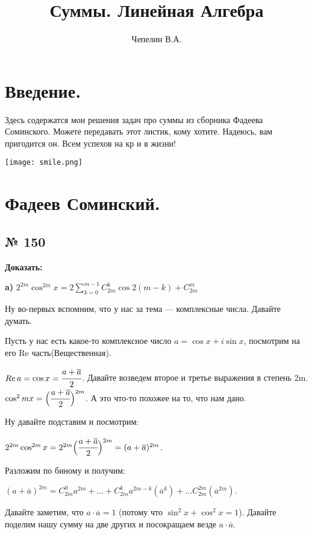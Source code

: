 \documentclass{article}
\title{Суммы. Линейная Алгебра}
\author{Чепелин В.А.}
\date{}
\begin{document}
\maketitle
\tableofcontents
\pagebreak
\section{Введение.}

 Здесь содержатся мои решения задач про суммы 
 из сборника Фадеева Соминского. Можете передавать этот листик, кому хотите. Надеюсь, вам пригодится он. Всем успехов на кр и в жизни!
\begin{center}
   \texttt{[image: smile.png]}
\end{center}

 \pagebreak
 
 \section{Фадеев Соминский.}
 \subsection{№ 150}
 
   \textbf{ Доказать:}
    
    \textbf{a)} $2^{2m}\cos^{2m} x = 2 \sum\limits_{k=0}^{m-1} C_{2m}^k \cos2(m-k) + C_{2m}^m$  

    Ну во-первых вспомним, что у нас за тема --- комплексные числа. Давайте думать.

    Пусть у нас есть какое-то комплексное число $a = \cos x + i\sin x$, посмотрим на его Re часть(Вещественная).
    
    $Re\, a = \cos x = \cfrac{a+\overline{a}}{2}$. Давайте возведем второе и третье выражения в степень 2m. $\cos^2m x = \Big(\cfrac{a+\overline{a}}{2}\Big)^{2m}$. А это что-то похожее на то, что нам дано. 
    
    Ну давайте подставим и посмотрим:

    $2^{2m}\cos^{2m} x = 2^{2m} \Big(\cfrac{a+\overline{a}}{2}\Big)^{2m} = (a+\overline{a})^{2m} $.

    Разложим по биному и получим:
    
    $(a+\overline{a})^{2m} = C_{2m}^{0} a^{2m} + \ldots + C_{2m}^{k} a^{2m-k}(\overline{a}^{k}) + \ldots  C_{2m}^{2m} ( \overline{a}^{2m})$.

    Давайте заметим, что $a\cdot \overline{a} = 1$ (потому что $\sin^2x +\cos^2 x =1$). Давайте поделим нашу сумму на две других и посокращаем везде $a\cdot \overline{a}$.
\end{document}
